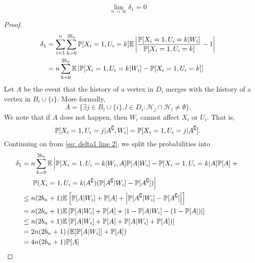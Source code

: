 	\begin{lemma}
	\label{lem:delta1 goes to 0}
		\begin{equation}
			\lim_{n\rightarrow\infty} \delta_1 = 0
		\end{equation}
	\end{lemma}
	\begin{proof}
		\begin{align}
			\delta_1 &= \sum_{i = 1}^n \sum_{k = 0}^{2 b_n} \prob[X_i = 1, U_i = k] \expect \left| \frac{\prob[X_i = 1, U_i = k|W_i]}{\prob[X_i = 1, U_i = k]} - 1 \right|\\
			&= n \sum_{k = 0}^{2 b_n} \expect \left|\prob[X_i = 1, U_i = k|W_i] - \prob[X_i = 1, U_i = k] \right|%
			\label{eq: delta1 line 2}
		\end{align}
		Let $A$ be the event that the history of a vertex in $D_i$ merges with the history of a vertex in $B_i \cup \{i\}$. More formally,
		\begin{equation}
			A = \{ \exists j \in B_i \cup \{i\}, l \in D_i : \mathcal{H}_j \cap \mathcal{H}_l \neq \emptyset\}.
		\end{equation}
		We note that if $A$ does not happen, then $W_i$ cannot affect $X_i$ or $U_i$. That is,
		\begin{equation}
			\mathbb{P}[X_i = 1, U_i = j | A^\complement, W_i] = \mathbb{P}[X_i = 1, U_i = j | A^\complement].
		\end{equation} 
		Continuing on from \eqref{eq: delta1 line 2}, we split the probabilities into
		\begin{align}
			\delta_1 &= n \sum_{k = 0}^{2 b_n} \mathbb{E} \left| \mathbb{P}[X_i = 1, U_i = k|W_i, A]\mathbb{P}[A|W_i] - \mathbb{P}[X_i = 1, U_i = k| A]\mathbb{P}[A] + \vphantom{A^\complement} \right.\\
			&\hphantom{= .} \left.\mathbb{P}(X_i = 1, U_i = k | A^\complement) (\mathbb{P}[A^\complement|W_i] - \mathbb{P}[A^\complement]) \right| \notag \\
			&\leq n (2b_n+1) \mathbb{E}\left[ \mathbb{P}[A|W_i] + \mathbb{P}[A] + \left|\mathbb{P}[A^\complement|W_i] - \mathbb{P}[A^\complement]\right|\right]\\
			&= n (2b_n + 1) \mathbb{E}\left[ \mathbb{P}[A|W_i] + \mathbb{P}[A] + \left|1 - \mathbb{P}[A|W_i] - (1 - \mathbb{P}[A])\right|\right]\\
			&\leq n (2b_n + 1) \mathbb{E}\left[ \mathbb{P}[A|W_i] + \mathbb{P}[A] + \mathbb{P}[A|W_i] + \mathbb{P}[A])\right]\\
			&= 2 n (2b_n + 1) \left(\mathbb{E}[\mathbb{P}[A|W_i]] + \mathbb{P}[A]\right)\\
			&= 4 n (2b_n + 1) \mathbb{P}[A]
		\end{align}


\end{proof}
